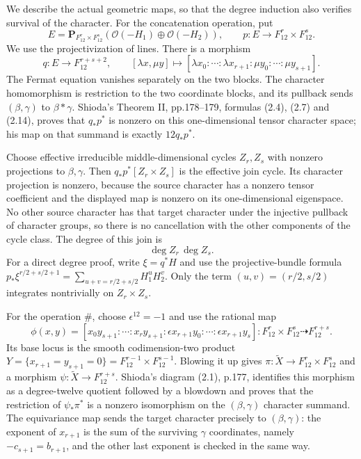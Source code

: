 We describe the actual geometric maps, so that the degree
induction also verifies survival of the character.
For the concatenation operation, put
\[
 E=\mathbf P_{F_{12}^r\times F_{12}^s}
       (\mathcal O(-H_1)\oplus\mathcal O(-H_2)),
 \qquad p:E\longrightarrow F_{12}^r\times F_{12}^s.
\]
We use the projectivization of lines.  There is a morphism
\[
 q:E\longrightarrow F_{12}^{r+s+2},
 \qquad [\lambda x,\mu y]\longmapsto
                   [\lambda x_0:\cdots:\lambda x_{r+1}:
                    \mu y_0:\cdots:\mu y_{s+1}].
                                                        \tag{N15.6}
\]
The Fermat equation vanishes separately on the two blocks.
The character homomorphism is restriction to the two coordinate
blocks, and its pullback sends $(\beta,\gamma)$ to
$\beta*\gamma$.
Shioda's Theorem II, pp.178--179, formulas (2.4), (2.7)
and (2.14), proves that $q_*p^*$ is nonzero on this
one-dimensional tensor character space; his map on that
summand is exactly $12q_*p^*$.

Choose effective irreducible middle-dimensional cycles
$Z_r,Z_s$ with nonzero projections to $\beta,\gamma$.
Then $q_*p^*[Z_r\times Z_s]$ is the effective join cycle.
Its character projection is nonzero, because the source
character has a nonzero tensor coefficient and the displayed
map is nonzero on its one-dimensional eigenspace.  No other
source character has that target character under the injective
pullback of character groups, so there is no cancellation with
the other components of the cycle class.
The degree of this join is
\[
                     \deg Z_r\,\deg Z_s.             \tag{N15.7}
\]
For a direct degree proof, write $\xi=q^*H$ and use the
projective-bundle formula
$p_*\xi^{r/2+s/2+1}=\sum_{u+v=r/2+s/2}H_1^uH_2^v$.
Only the term $(u,v)=(r/2,s/2)$ integrates nontrivially
on $Z_r\times Z_s$.

For the operation $\#$, choose $\epsilon^{12}=-1$ and use
the rational map
\begin{equation}
 \phi(x,y)=
 [x_0y_{s+1}:\cdots:x_ry_{s+1}:
       \epsilon x_{r+1}y_0:\cdots:\epsilon x_{r+1}y_s]
 :F_{12}^r\times F_{12}^s\dashrightarrow F_{12}^{r+s}.
                                                        \tag{N15.8}
\end{equation}
Its base locus is the smooth codimension-two product
$Y=\{x_{r+1}=y_{s+1}=0\}=F_{12}^{r-1}\times F_{12}^{s-1}$.
Blowing it up gives
$\pi:\widetilde X\to F_{12}^r\times F_{12}^s$ and a
morphism $\psi:\widetilde X\to F_{12}^{r+s}$.
Shioda's diagram (2.1), p.177, identifies this morphism as
a degree-twelve quotient followed by a blowdown and proves
that the restriction of $\psi_*\pi^*$ is a nonzero
isomorphism on the $(\beta,\gamma)$ character summand.
The equivariance map sends the target character precisely
to $(\beta,\gamma)$: the exponent of $x_{r+1}$ is the sum
of the surviving $\gamma$ coordinates, namely
$-c_{s+1}=b_{r+1}$, and the other last exponent is checked
in the same way.

